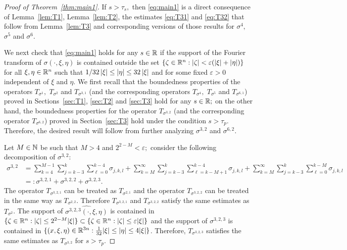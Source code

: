 \begin{proof}[Proof of Theorem~\ref{thm:main1}] If $s>\tau_s,$ then \eqref{eq:main1}  is a direct consequence of  Lemma~\ref{lem:T1}, Lemma~\ref{lem:T2}, the estimates \eqref{eq:T31} and \eqref{eq:T32} that follow from Lemma~\ref{lem:T3} and corresponding versions  of those results for $\sigma^4,$  $\sigma^5$ and $\sigma^6.$

We next check that \eqref{eq:main1} holds for any $s\in \mathbb{R}$ if the support of the Fourier transform of $\sigma(\cdot,\xi,\eta)$ is contained outside the set 
$\{\zeta\in{{\mathbb R}^n}:\left\vert \zeta \right\vert<\varepsilon (\left\vert \xi \right\vert+\left\vert \eta \right\vert)\}$ for all  $\xi,\eta\in{{\mathbb R}^n}$ such that $1/32\left\vert \xi \right\vert\le \left\vert \eta \right\vert\le 32 \left\vert \xi \right\vert$ and for some fixed $\varepsilon>0$ independent of $\xi$ and $\eta.$ We first recall that the boundedness properties of the operators $T_{\sigma^1},$ $T_{\sigma^2}$ and $T_{\sigma^{3,1}}$ (and the corresponding operators $T_{\sigma^4},$ $T_{\sigma^5}$ and $T_{\sigma^{6,1}}$) proved in Sections~\ref{sec:T1}, \ref{sec:T2} and \ref{sec:T3} hold for any $s\in \mathbb{R};$ on the other hand,  the boundedness properties for the operator $T_{\sigma^{3,2}}$ (and the corresponding operator $T_{\sigma^{6,2}}$) proved in Section~\ref{sec:T3} hold under the condition $s>\tau_p.$   Therefore, the desired result will follow from further analyzing $\sigma^{3,2}$ and $\sigma^{6,2}.$ 

Let $M\in\mathbb{N}$ be such that $M>4$ and $2^{2-M}<\varepsilon;$ consider the following decomposition of $\sigma^{3,2}:$
\begin{align*}
\sigma^{3,2}&=\sum_{k=4}^{M-1}\sum_{j=k-3}^k\sum_{\ell=0}^{k-4}\sigma_{j,k,l}+\sum_{k=M}^{\infty}\sum_{j=k-3}^k\sum_{\ell=k-M+1}^{k-4}\sigma_{j,k,l}+\sum_{k=M}^{\infty}\sum_{j=k-3}^k\sum_{\ell=0}^{k-M}\sigma_{j,k,l}\\&=:\sigma^{3,2,1} +\sigma^{3,2,2}+\sigma^{3,2,3}.
\end{align*}
The operator $T_{\sigma^{3,2,1}}$ can be treated as $T_{\sigma^{2,1}}$ and the operator $T_{\sigma^{3,2,2}}$ can be treated in the same way as $T_{\sigma^{2,2}}$. Therefore $T_{\sigma^{3,2,1}}$ and $T_{\sigma^{3,2,2}}$ satisfy the same estimates as $T_{\sigma^2}$. The support of $\widehat{\sigma^{3,2,3}(\cdot,\xi,\eta)}$ is contained in $\{\zeta\in{{\mathbb R}^n}: |\zeta| \leq 2^{2-M} |\xi| \} \subset \{\zeta\in{{\mathbb R}^n}: |\zeta| \leq \varepsilon |\xi| \}$ and the support of $\sigma^{3,2,3}$ is contained in $\{(x,\xi,\eta)\in\mathbb{R}^{3n}: \frac{1}{32}|\xi| \leq |\eta| \leq 4|\xi| \}$. Therefore, $T_{\sigma^{3,2,3}}$ satisfies the same estimates as $T_{\sigma^{3,2}}$ for $s>\tau_p$.


\end{proof}
